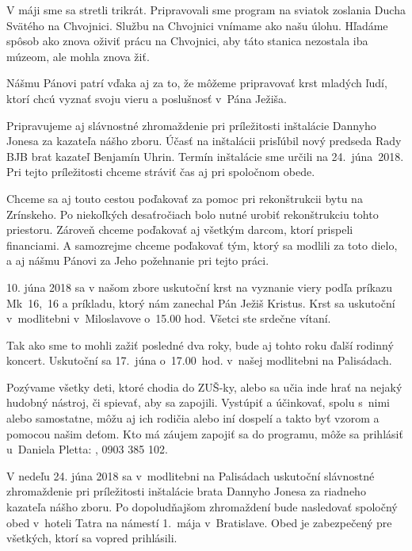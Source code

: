 V máji sme sa stretli trikrát. Pripravovali sme program na sviatok zoslania Ducha Svätého na Chvojnici. Službu na Chvojnici vnímame ako našu úlohu. Hľadáme spôsob ako znova oživiť prácu na Chvojnici, aby táto stanica nezostala iba múzeom, ale mohla znova žiť.

Nášmu Pánovi patrí vďaka aj za to, že môžeme pripravovať krst mladých ľudí, ktorí chcú vyznať svoju vieru a poslušnosť v~Pána Ježiša.

Pripravujeme aj slávnostné zhromaždenie pri príležitosti inštalácie Dannyho Jonesa za kazateľa nášho zboru. Účasť na inštalácii prisľúbil nový predseda Rady BJB brat kazateľ Benjamín Uhrin. Termín inštalácie sme určili na 24.~júna~2018. Pri tejto príležitosti chceme stráviť čas aj pri spoločnom obede.

Chceme sa aj touto cestou poďakovať za pomoc pri rekonštrukcii bytu na Zrínskeho. Po niekoľkých desaťročiach bolo nutné urobiť rekonštrukciu tohto priestoru. Zároveň chceme poďakovať aj všetkým darcom, ktorí prispeli financiami. A samozrejme chceme poďakovať tým, ktorý sa modlili za toto dielo, a aj nášmu Pánovi za Jeho požehnanie pri tejto práci.



10. júna 2018 sa v našom zbore uskutoční krst na vyznanie viery podľa príkazu Mk~16,~16 a príkladu, ktorý nám zanechal Pán Ježiš Kristus. Krst sa uskutoční v~modlitebni v~Miloslavove o~15.00 hod. Všetci ste srdečne vítaní.


Tak ako sme to mohli zažiť posledné dva roky, bude aj tohto roku ďalší rodinný koncert. Uskutoční sa 17.~júna o~17.00~hod. v~našej modlitebni na Palisádach.

Pozývame všetky deti, ktoré chodia do ZUŠ-ky, alebo sa učia inde hrať na nejaký hudobný nástroj, či spievať, aby sa zapojili. Vystúpiť a účinkovať, spolu s~nimi alebo samostatne, môžu aj ich rodičia alebo iní dospelí a takto byť vzorom a pomocou našim deťom. Kto má záujem zapojiť sa do programu, môže sa prihlásiť u~Daniela Pletta: , 0903 385 102.


V nedeľu 24. júna 2018 sa v~modlitebni na Palisádach uskutoční slávnostné zhromaždenie pri príležitosti inštalácie brata Dannyho Jonesa za riadneho kazateľa nášho zboru. Po dopoludňajšom zhromaždení bude nasledovať spoločný obed v~hoteli Tatra na námestí 1.~mája v~Bratislave. Obed je zabezpečený pre všetkých, ktorí sa vopred prihlásili.


